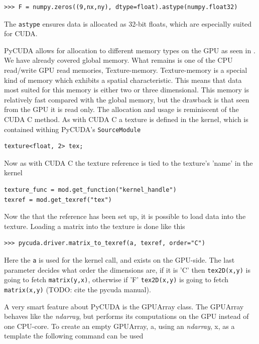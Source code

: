 \begin{verbatim}
>>> F = numpy.zeros((9,nx,ny), dtype=float).astype(numpy.float32)
\end{verbatim}

The \texttt{astype} ensures data is allocated as 32-bit floats, which are especially suited for CUDA.

PyCUDA allows for allocation to different memory types on the GPU as seen in . We have already covered global memory. What remains is one of the CPU read/write GPU read memories, Texture-memory. Texture-memory is a special kind of memory which exhibits a spatial characteristic. This means that data most suited for this memory is either two or three dimensional. This memory is relatively fast compared with the global memory, but the drawback is that seen from the GPU it is read only. The allocation and usage is reminiscent of the CUDA C method. As with CUDA C a texture is defined in the kernel, which is contained withing PyCUDA's \texttt{SourceModule}

\begin{verbatim}
texture<float, 2> tex;
\end{verbatim}

Now as with CUDA C the texture reference is tied to the texture's 'name' in the kernel

\begin{verbatim}
texture_func = mod.get_function("kernel_handle")
texref = mod.get_texref("tex")
\end{verbatim}

Now the that the reference has been set up, it is possible to load data into the texture. Loading a matrix into the texture is done like this

\begin{verbatim}
>>> pycuda.driver.matrix_to_texref(a, texref, order="C")
\end{verbatim}

Here the \texttt{a} is used for the kernel call, and exists on the GPU-side. The last parameter decides what order the dimensions are, if it is 'C' then \texttt{tex2D(x,y)} is going to fetch \texttt{matrix(y,x)}, otherwise if 'F' \texttt{tex2D(x,y)} is going to fetch \texttt{matrix(x,y)} (TODO: cite the pycuda manual).

A very smart feature about PyCUDA is the GPUArray class. The GPUArray behaves like the \textit{ndarray}, but performs its computations on the GPU instead of one CPU-core. To create an empty GPUArray, a, using an \textit{ndarray}, x, as a template the following command can be used

